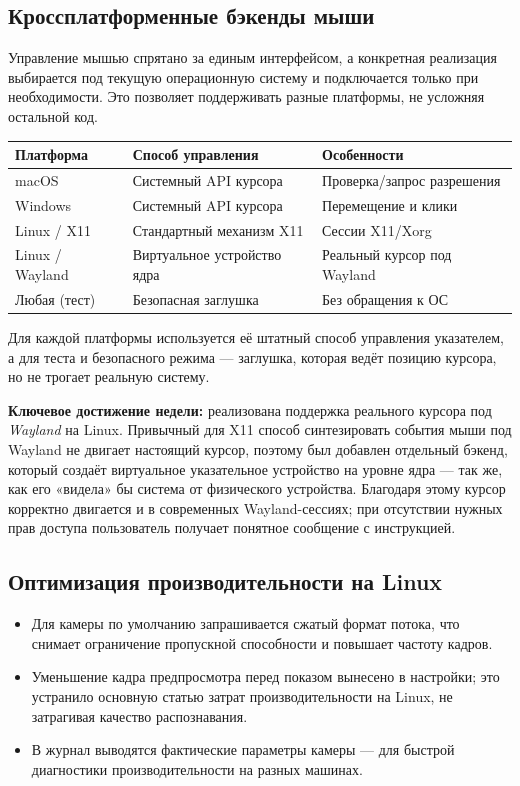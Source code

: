 \documentclass[11pt,a4paper]{article}
\newcommand{\highlight}[1]{\colorbox{accentlight}{\parbox{\dimexpr\linewidth-2\fboxsep}{#1}}}
\begin{document}
\subsection{Кроссплатформенные бэкенды мыши}

Управление мышью спрятано за единым интерфейсом, а конкретная реализация выбирается под текущую
операционную систему и подключается только при необходимости. Это позволяет поддерживать разные
платформы, не усложняя остальной код.

\begin{center}
\begin{tabular}{l l l}
\toprule
\textbf{Платформа} & \textbf{Способ управления} & \textbf{Особенности} \\
\midrule
macOS          & Системный API курсора   & Проверка/запрос разрешения \\
Windows        & Системный API курсора   & Перемещение и клики \\
Linux / X11    & Стандартный механизм X11 & Сессии X11/Xorg \\
Linux / Wayland & Виртуальное устройство ядра & Реальный курсор под Wayland \\
Любая (тест)   & Безопасная заглушка     & Без обращения к ОС \\
\bottomrule
\end{tabular}
\end{center}

\noindent Для каждой платформы используется её штатный способ управления указателем, а для
теста и безопасного режима — заглушка, которая ведёт позицию курсора, но не трогает реальную
систему.

\highlight{\textbf{Ключевое достижение недели:} реализована поддержка реального курсора под
\emph{Wayland} на Linux. Привычный для X11 способ синтезировать события мыши под Wayland не
двигает настоящий курсор, поэтому был добавлен отдельный бэкенд, который создаёт виртуальное
указательное устройство на уровне ядра — так же, как его «видела» бы система от физического
устройства. Благодаря этому курсор корректно двигается и в современных Wayland-сессиях; при
отсутствии нужных прав доступа пользователь получает понятное сообщение с инструкцией.}

\subsection{Оптимизация производительности на Linux}

\begin{itemize}[leftmargin=1.4em]
  \item Для камеры по умолчанию запрашивается сжатый формат потока, что снимает ограничение
        пропускной способности и повышает частоту кадров.
  \item Уменьшение кадра предпросмотра перед показом вынесено в настройки; это устранило
        основную статью затрат производительности на Linux, не затрагивая качество распознавания.
  \item В журнал выводятся фактические параметры камеры — для быстрой диагностики
        производительности на разных машинах.
\end{itemize}
\end{document}
